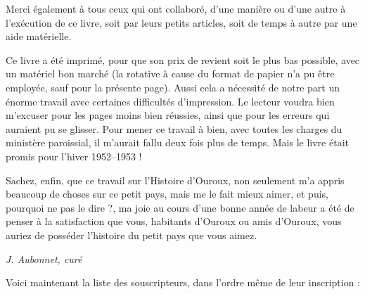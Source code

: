 \documentclass[11pt,a4paper]{report}
\begin{document}
Merci également à tous ceux qui ont collaboré, d'une manière ou d'une autre à
l'exécution de ce livre, soit par leurs petits articles, soit de temps à autre
par une aide matérielle.

Ce livre a été imprimé, pour que son prix de revient soit le plus bas possible,
avec un matériel bon marché (la rotative à cause du format de papier n'a pu être
employée, sauf pour la présente page). Aussi cela a nécessité de notre part un
énorme travail avec certaines difficultés d'impression. Le lecteur voudra bien
m'excuser pour les pages moins bien réussies, ainsi que pour les erreurs qui
auraient pu se glisser. Pour mener ce travail à bien, avec toutes les charges du
ministère paroissial, il m'aurait fallu deux fois plus de temps. Mais le livre
était promis pour l'hiver 1952--1953 !

Sachez, enfin, que ce travail sur l'Histoire d'Ouroux, non seulement m'a appris
beaucoup de choses sur ce petit pays, mais me le fait mieux aimer, et puis,
pourquoi ne pas le dire ?, ma joie au cours d'une bonne année de labeur a été de
penser à la satisfaction que vous, habitants d'Ouroux ou amis d'Ouroux, vous
auriez de posséder l'histoire du petit pays que vous aimez.

\begin{flushright}
    \textit{J. Aubonnet, curé}
\end{flushright}

Voici maintenant la liste des souscripteurs, dans l'ordre même de leur
inscription :
\end{document}
